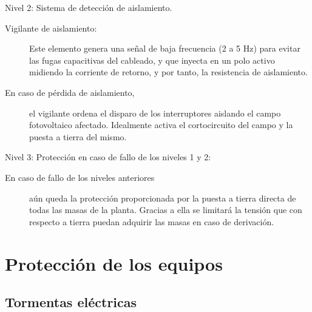 \documentclass[aspectratio=169, usenames,svgnames,dvipsnames]{beamer}
\begin{document}
\begin{frame}[label={sec:org49308bf}]{Nivel 2: Sistema de detección de aislamiento.}
\begin{description}
\item[{Vigilante de aislamiento:}] Este elemento genera una señal de baja
frecuencia (2 a 5 Hz) para evitar las fugas capacitivas del cableado,
y que inyecta en un polo activo midiendo la corriente de retorno, y
por tanto, la resistencia de aislamiento.

\item[{En caso de pérdida de aislamiento,}] el vigilante ordena el
disparo de los interruptores aislando el campo fotovoltaico
afectado. Idealmente activa el cortocircuito del campo y la puesta a
tierra del mismo.
\end{description}
\end{frame}

\begin{frame}[label={sec:org1c835b9}]{Nivel 3: Protección en caso de fallo de los niveles 1 y 2:}
\begin{description}
\item[{En caso de fallo de los niveles anteriores}] aún queda la
protección proporcionada por la puesta a tierra directa de todas las
masas de la planta. Gracias a ella se limitará la tensión que con
respecto a tierra puedan adquirir las masas en caso de derivación.
\end{description}
\end{frame}



\section{Protección de los equipos}
\label{sec:org32579e5}

\subsection{Tormentas eléctricas}
\label{sec:org03efa14}
\end{document}
